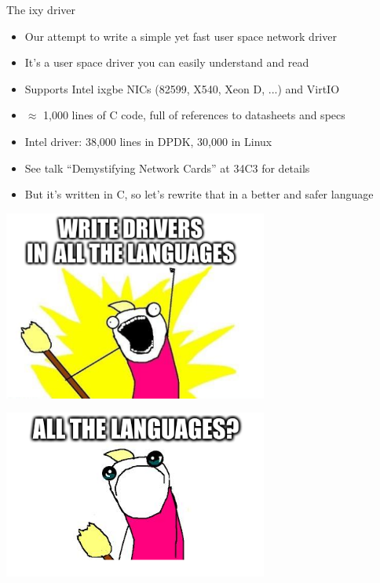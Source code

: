 \documentclass[NET,english,aspectratio=169,notitleframe]{tumbeamer}
\begin{document}
\begin{frame}{The ixy driver}
\begin{itemize}
\item Our attempt to write a simple yet fast user space network driver
\item It's a user space driver you can easily understand and read
\item Supports Intel ixgbe NICs (82599, X540, Xeon D, ...) and VirtIO 
\item $\approx$ 1,000 lines of C code, full of references to datasheets and specs
\item Intel driver: 38,000 lines in DPDK, 30,000 in Linux
\item See talk ``Demystifying Network Cards'' at 34C3 for details
\vspace{1ex}
\item But it's written in C, so let's rewrite that in a better and safer language
\end{itemize}
\end{frame}

\begin{frame}{}
\centering\includegraphics[width=0.65\textwidth]{pics/allthe1}
\end{frame}

\begin{frame}{}
\centering\includegraphics[width=0.65\textwidth]{pics/allthe2}
\end{frame}
\end{document}
